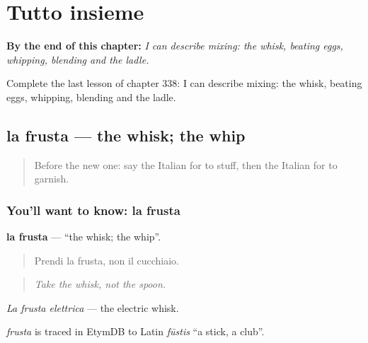 
\chapter{Tutto insieme}
\label{ch:it-tutto-insieme}

\begin{chapteropening}
\textbf{By the end of this chapter:} \emph{I can describe mixing: the whisk, beating eggs, whipping, blending and the ladle.}

Complete the last lesson of chapter 338: I can describe mixing: the whisk, beating eggs, whipping, blending and the ladle.
\end{chapteropening}

\section[la frusta]{la frusta — the whisk; the whip}

\label{lesson:IT-C338-frusta}



\begin{quote}
Before the new one: say the Italian for to stuff, then the Italian for to garnish.
\end{quote}

\subsection*{You'll want to know: la frusta}
\textbf{la frusta} — \textquotedblleft{}the whisk; the whip\textquotedblright{}.

\begin{quote}
Prendi la frusta, non il cucchiaio.
\end{quote}

\begin{quote}
\emph{Take the whisk, not the spoon.}
\end{quote}

\emph{La frusta elettrica} — the electric whisk.

\begin{cousinweb}
\emph{frusta} is traced in EtymDB to Latin \emph{fūstis} \textquotedblleft{}a stick, a club\textquotedblright{}.
\end{cousinweb}

